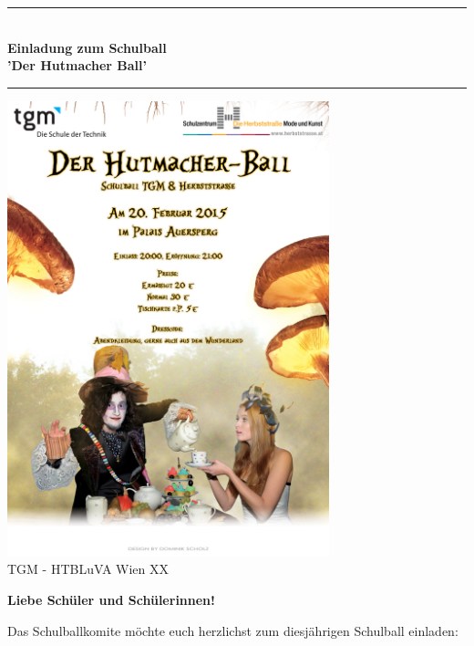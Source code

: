 \documentclass[12pt]{article}
\author{RoboNav}
\date{\today}
\begin{document}
\begin{titlepage}
\begin{center}

\rule{1.0\textwidth}{1mm}
{ \huge \bfseries \\[0.4cm]  \huge Einladung zum Schulball \\ \LARGE 'Der Hutmacher Ball' \\[0.4cm] }

\rule{1.0\textwidth}{1mm}
\vspace{0.5cm}

\includegraphics[width=0.7\textwidth]{ballplakatNEW}\\  

\small TGM - HTBLuVA Wien XX \\ [1.5cm]

\end{center}
\end{titlepage} 
\begin{center}
\textbf{Liebe Schüler und Schülerinnen!}
\end{center}
\vspace{0.6cm}
Das Schulballkomite möchte euch herzlichst zum diesjährigen Schulball einladen: \\
\end{document}
